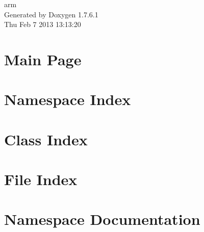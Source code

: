 \documentclass[a4paper]{book}
\begin{document}
\begin{titlepage}
\vspace*{7cm}
\begin{center}
{\Large arm }\\
\vspace*{1cm}
{\large \-Generated by Doxygen 1.7.6.1}\\
\vspace*{0.5cm}
{\small Thu Feb 7 2013 13:13:20}\\
\end{center}
\end{titlepage}
\clearemptydoublepage
{}
\tableofcontents
\clearemptydoublepage
{}
\chapter{\-Main \-Page}
\label{index}
\chapter{\-Namespace \-Index}

\chapter{\-Class \-Index}

\chapter{\-File \-Index}

\chapter{\-Namespace \-Documentation}










\end{document}
